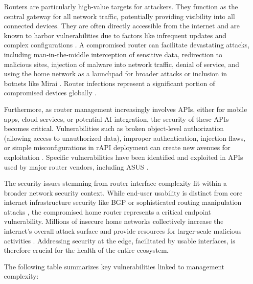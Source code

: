 Routers are particularly high-value targets for attackers. They function as the central gateway for all network traffic, potentially providing visibility into all connected devices. They are often directly accessible from the internet and are known to harbor vulnerabilities due to factors like infrequent updates and complex configurations \cite{router_exploitable}. A compromised router can facilitate devastating attacks, including man-in-the-middle interception of sensitive data, redirection to malicious sites, injection of malware into network traffic, denial of service, and using the home network as a launchpad for broader attacks or inclusion in botnets like Mirai \cite{router_exploitable}. Router infections represent a significant portion of compromised devices globally \cite{router_exploitable}.

Furthermore, as router management increasingly involves APIs, either for mobile apps, cloud services, or potential AI integration, the security of these APIs becomes critical. Vulnerabilities such as broken object-level authorization (allowing access to unauthorized data), improper authentication, injection flaws, or simple misconfigurations in rAPI deployment can create new avenues for exploitation \cite{secure_router}. Specific vulnerabilities have been identified and exploited in APIs used by major router vendors, including ASUS \cite{secure_router}.

The security issues stemming from router interface complexity fit within a broader network security context. While end-user usability is distinct from core internet infrastructure security like BGP \cite{ai_networking} or sophisticated routing manipulation attacks \cite{secure_router}, the compromised home router represents a critical endpoint vulnerability. Millions of insecure home networks collectively increase the internet's overall attack surface and provide resources for larger-scale malicious activities \cite{router_exploitable}. Addressing security at the edge, facilitated by usable interfaces, is therefore crucial for the health of the entire ecosystem.

The following table summarizes key vulnerabilities linked to management complexity:

